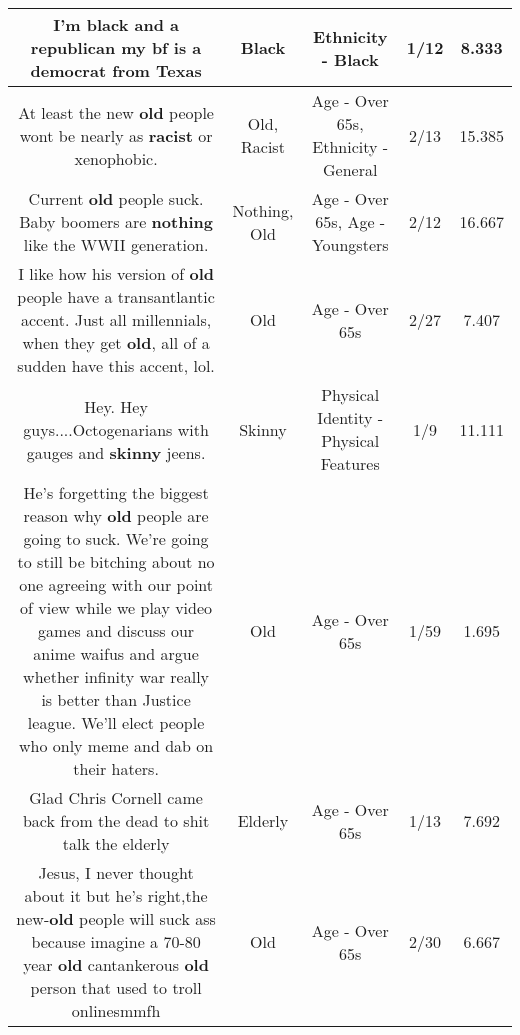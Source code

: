 \documentclass[11pt]{article}
\newlength\mylength
\begin{document}
\begin{center}
\begin{longtable}{|C{.65\mylength}|C{.30\mylength}|C{.12\mylength}|C{.12\mylength}|C{.12\mylength}|}
  \small I'm \textbf{black} and a republican my bf is a democrat from Texas\normalsize   & Black & Ethnicity - Black & 1/12 & 8.333 \\  \hline
  \small At least the new \textbf{old} people wont be nearly as \textbf{racist} or xenophobic.\normalsize   & Old, Racist & Age - Over 65s, Ethnicity - General & 2/13 & 15.385 \\  \hline
  \small Current \textbf{old} people suck. Baby boomers are \textbf{nothing} like the WWII generation.\normalsize   & Nothing, Old & Age - Over 65s, Age - Youngsters & 2/12 & 16.667 \\  \hline
  \small I like how his version of \textbf{old} people have a  transantlantic accent. Just all millennials,  when they get \textbf{old}, all of a sudden have this accent, lol.\normalsize   & Old & Age - Over 65s & 2/27 & 7.407 \\  \hline
  \small Hey. Hey guys....Octogenarians with gauges and \textbf{skinny} jeens.\normalsize   & Skinny & Physical Identity - Physical Features & 1/9 & 11.111 \\  \hline
  \small He's forgetting the biggest reason why \textbf{old} people are going to suck. We're going to still be bitching about no one agreeing with our point of view while we play video games and discuss our anime waifus and argue whether infinity war really is better than Justice league. We'll elect people who only meme and dab on their haters.\normalsize   & Old & Age - Over 65s & 1/59 & 1.695 \\  \hline
  \small Glad Chris Cornell came back from the dead to shit talk the elderly\normalsize   & Elderly & Age - Over 65s & 1/13 & 7.692 \\  \hline
  \small Jesus, I never thought about it but he's right,the new-\textbf{old} people will suck ass because imagine a 70-80 year \textbf{old} cantankerous \textbf{old} person that used to troll onlinesmmfh\normalsize   & Old & Age - Over 65s & 2/30 & 6.667 \\  \hline

\end{longtable}
\end{center}
\end{document}
